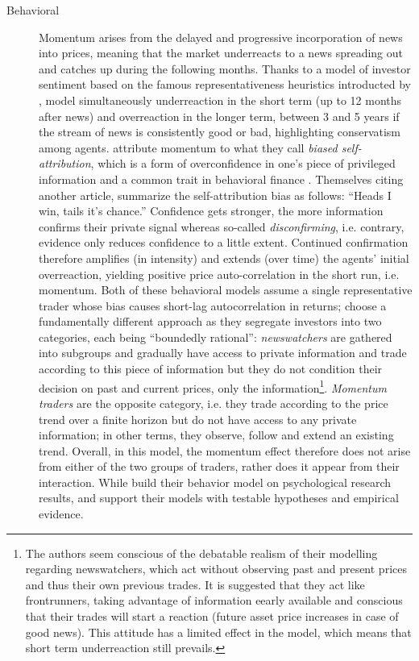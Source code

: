 \begin{description}
\item[Behavioral] Momentum arises from the delayed and progressive incorporation of news into prices, meaning that the market underreacts to a news spreading out and catches up during the following months. Thanks to a model of investor sentiment based on the famous representativeness heuristics introducted by \cite{Tversky1974},\cite{Barberis1998} model simultaneously underreaction in the short term (up to 12 months after news) and overreaction in the longer term, between 3 and 5 years if the stream of news is consistently good or bad, highlighting conservatism among agents. \cite{Daniel1998} attribute momentum to what they call \emph{biased self-attribution}, which is a form of overconfidence in one's piece of privileged information and a common trait in behavioral finance \parencite{DeBondt1994}. Themselves citing another article, \cite{Daniel1998} summarize the self-attribution bias as follows: ``Heads I win, tails it's chance.'' Confidence gets stronger, the more information confirms their private signal whereas so-called \emph{disconfirming}, i.e. contrary, evidence only reduces confidence to a little extent. Continued confirmation therefore amplifies (in intensity) and extends (over time) the agents' initial overreaction, yielding positive price auto-correlation in the short run, i.e. momentum. Both of these behavioral models assume a single representative trader whose bias causes short-lag autocorrelation in returns; \cite{Hong1999} choose a fundamentally different approach as they segregate investors into two categories, each being ``boundedly rational'': \emph{newswatchers} are gathered into subgroups and gradually have access to private information and trade according to this piece of information but they do not condition their decision on past and current prices, only the information\footnote{The authors seem conscious of the debatable realism of their modelling regarding newswatchers, which act without observing past and present prices and thus their own previous trades. It is suggested that they act like frontrunners, taking advantage of information eearly available and conscious that their trades will start a reaction (future asset price increases in case of good news). This attitude has a limited effect in the model, which means that short term underreaction still prevails. }. \emph{Momentum traders} are the opposite category, i.e. they trade according to the price trend over a finite horizon but do not have access to any private information; in other terms, they observe, follow and extend an existing trend. Overall, in this model, the momentum effect therefore does not arise from either of the two groups of traders, rather does it appear from their interaction. While \cite{Daniel1998} build their behavior model on psychological research results, \cite{Barberis1998} and \cite{Hong1999} support their models with testable hypotheses and empirical evidence.

\end{description}
